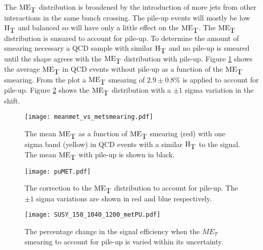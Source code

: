 The $\mbox{ME}_{\mbox{T}}$ distribution is broadened by the introduction of more jets from other
interactions in the same bunch crossing. The pile-up events will mostly be low
$\mbox{H}_{\mbox{T}}$ and balanced so will have only a little effect on the $\mbox{ME}_{\mbox{T}}$. The $\mbox{ME}_{\mbox{T}}$
distribution is smeared to account for pile-up. To determine the amount of
smearing necessary a QCD sample with similar $\mbox{H}_{\mbox{T}}$ and no pile-up is smeared
until the shape agrees with the $\mbox{ME}_{\mbox{T}}$ distribution with pile-up. Figure 
\ref{fig:meanmet_vs_metsmearing} shows the average $\mbox{ME}_{\mbox{T}}$ in QCD events without 
pile-up as a function of the $\mbox{ME}_{\mbox{T}}$ smearing. From the plot a $\mbox{ME}_{\mbox{T}}$ smearing of 
$2.9\pm0.8\%$ is applied to account for pile-up. Figure \ref{fig:puMET} shows the 
$\mbox{ME}_{\mbox{T}}$ distribution with a $\pm 1$ sigma variation in the shift. \\

\begin{figure}
\begin{center}
\texttt{[image: meanmet\_vs\_metsmearing.pdf]}
\end{center}
\caption{The mean $\mbox{ME}_{\mbox{T}}$ as a function of $\mbox{ME}_{\mbox{T}}$ smearing (red) with one sigma
band (yellow) in QCD events with a similar $\mbox{H}_{\mbox{T}}$ to the signal. The mean $\mbox{ME}_{\mbox{T}}$ 
with pile-up is shown in black.}
\label{fig:meanmet_vs_metsmearing}
\end{figure}

\begin{figure}
\begin{center}
\texttt{[image: puMET.pdf]}
\end{center}
\caption{The correction to the $\mbox{ME}_{\mbox{T}}$ distribution to account for pile-up. The
$\pm 1$ sigma variations are shown in red and blue respectively.}
\label{fig:puMET}
\end{figure}

\begin{figure}
\begin{center}
\texttt{[image: SUSY\_150\_1040\_1200\_metPU.pdf]}
\end{center}
\caption{The percentage change in the signal efficiency when the $ME_{T}$
smearing to account for pile-up is varied within its uncertainty.} 
\label{fig:puMET_Numbers}
\end{figure}

